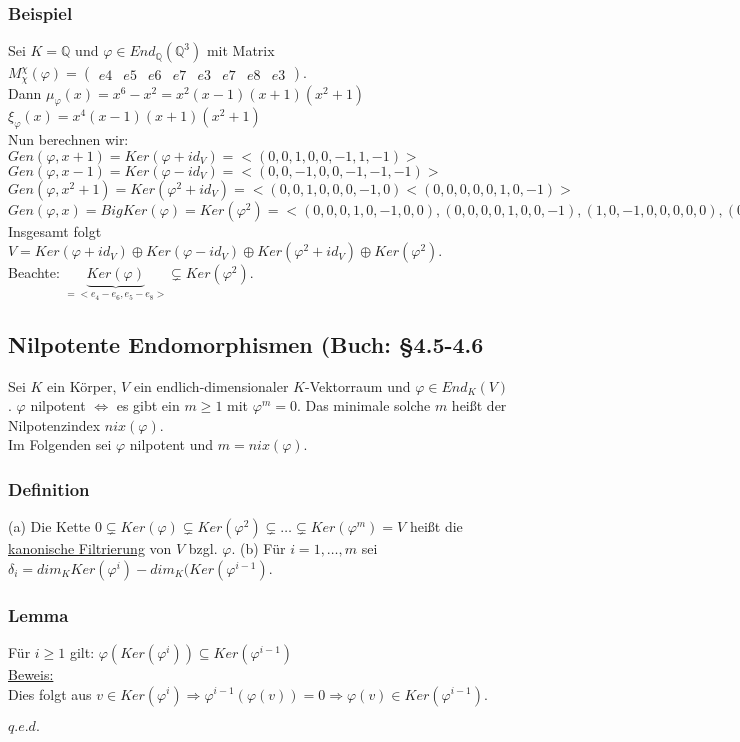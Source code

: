 \documentclass[a4paper]{article}
\newcommand{\ul}{\underline}
\renewcommand{\proof}{\ul{Beweis:}\\}
\renewcommand{\qed}{\begin{flushright}
\ul{\(q.e.d.\)}
\end{flushright}}
\let\phi\varphi
\begin{document}
\subsubsection{Beispiel}
Sei \(K = \mathbb{Q}\) und \(\phi \in End_\mathbb{Q}(\mathbb{Q}^3)\) mit Matrix \(M_\chi^\chi(\phi)=\begin{pmatrix}
e4 & e5 & e6 & e7 & e3 & e7 & e8 & e3
\end{pmatrix}\).\\
Dann \(\mu_\phi(x)=x^6-x^2=x^2(x-1)(x+1)(x^2+1)\)\\
\(\xi_\phi(x)=x^4(x-1)(x+1)(x^2+1)\)\\
Nun berechnen wir: \(Gen(\phi, x+1)=Ker(\phi+id_V)=<(0,0,1,0,0,-1,1,-1)>\)\\
\(Gen(\phi, x-1)=Ker(\phi-id_V)=<(0,0,-1,0,0,-1,-1,-1)>\)\\
\(Gen(\phi, x^2+1)=Ker(\phi^2+id_V)=<(0,0,1,0,0,0,-1,0)<(0,0,0,0,0,1,0,-1)>\)\\
\(Gen(\phi, x)=BigKer(\phi)=Ker(\phi^2)=<(0,0,0,1,0,-1,0,0),(0,0,0,0,1,0,0,-1),(1,0,-1,0,0,0,0,0),(0,1,0,0,0,0,-1,0)>\)\\
Insgesamt folgt \(V=Ker(\phi+id_V)\oplus Ker(\phi-id_V) \oplus Ker(\phi^2+id_V)\oplus Ker(\phi^2)\).\\
Beachte: \(\underbrace{Ker(\phi)}_{=<e_4-e_6,e_5-e_8>} \subsetneq Ker(\phi^2)\).
\subsection{Nilpotente Endomorphismen (Buch: §4.5-4.6}
Sei \(K\) ein Körper, \(V\) ein endlich-dimensionaler \(K\)-Vektorraum und \(\phi\in End_K(V)\).
\(\phi\) nilpotent \(\Leftrightarrow\) es gibt ein \(m\geq 1\) mit \(\phi^m=0\). Das minimale solche \(m\) heißt der Nilpotenzindex \(nix(\phi)\).\\
Im Folgenden sei \(\phi\) nilpotent und \(m=nix(\phi)\).
\subsubsection{Definition}
(a) Die Kette \({0} \subsetneq Ker(\phi) \subsetneq Ker(\phi^2) \subsetneq \dots \subsetneq Ker(\phi^m)=V\) heißt die \ul{kanonische Filtrierung} von \(V\) bzgl. \(\phi\).
(b) Für \(i=1,\dots,m\) sei \(\delta_i=dim_K Ker(\phi^i)-dim_K(Ker(\phi^{i-1})\).
\subsubsection{Lemma}
Für \(i \geq 1\) gilt: \(\phi(Ker(\phi^i))\subseteq Ker(\phi^{i-1})\)\\
\proof
Dies folgt aus \(v\in Ker(\phi^i)\Rightarrow \phi^{i-1}(\phi(v))=0\Rightarrow \phi(v)\in Ker(\phi^{i-1})\).
\qed
\end{document}
